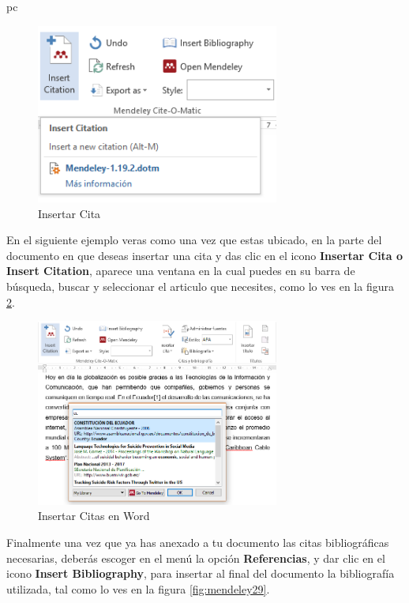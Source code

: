 pc\documentclass[a4paper,12pt,openany]{book}
\begin{document}
\begin{itemize}
        \begin{figure}[H]
        \centering
    	\includegraphics[width=8cm]{mendeley24.png}
        \caption{Insertar Cita}
        \label{fig:mendeley27}
        \end{figure}

En el siguiente ejemplo veras como una vez que estas ubicado, en la parte del documento en que deseas insertar una cita y das clic en el icono \textbf{Insertar Cita o Insert Citation},  aparece una ventana en la cual puedes en su barra de búsqueda, buscar y seleccionar el articulo que necesites, como lo ves en la figura \ref{fig:mendeley28}.

        \begin{figure}[H]
        \centering
    	\includegraphics[width=8cm]{mendeley25.png}
        \caption{Insertar Citas en Word}
        \label{fig:mendeley28}
        \end{figure}

Finalmente una vez que ya has anexado a tu documento las citas bibliográficas necesarias, deberás escoger en el menú la opción \textbf{Referencias}, y dar clic en el icono \textbf{Insert Bibliography}, para insertar al final del documento la bibliografía utilizada, tal como lo ves en la figura \ref{fig:mendeley29}.


\end{itemize}
\end{document}
